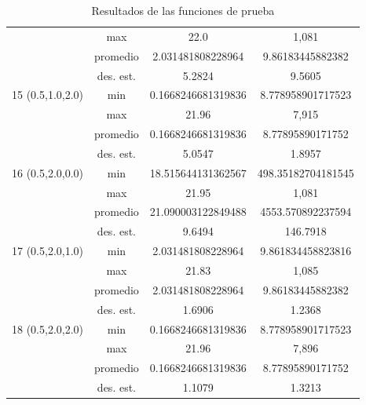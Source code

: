 \documentclass{report}
\begin{document}
\begin{table}[H]
\begin{tabular}{|c|c|c|c|}
                              & max                         &     22.0       &    1,081    \\ \cline{2-4} 
                              & promedio                    &     2.031481808228964       &    9.86183445882382    \\ \cline{2-4} 
                              & des. est.                   &  5.2824          &   9.5605     \\ \hline
        15 (0.5,1.0,2.0)                   & min                         &     0.1668246681319836       &   8.778958901717523     \\ \cline{2-4} 
                              & max                         &      21.96      &    7,915    \\ \cline{2-4} 
                              & promedio                    &      0.1668246681319836      &   8.77895890171752     \\ \cline{2-4} 
                              & des. est.                   &    5.0547        &  1.8957      \\ \hline
        16 (0.5,2.0,0.0)                   & min                         &      18.515644131362567      &    498.35182704181545    \\ \cline{2-4} 
                              & max                         &       21.95     &   1,081     \\ \cline{2-4} 
                              & promedio                    &     21.090003122849488       &   4553.570892237594     \\ \cline{2-4} 
                              & des. est.                   &    9.6494        &  146.7918      \\ \hline
        17 (0.5,2.0,1.0)                   & min                         &      2.031481808228964      &    9.861834458823816    \\ \cline{2-4} 
                              & max                         &       21.83     &    1,085    \\ \cline{2-4} 
                              & promedio                    &        2.031481808228964    &    9.86183445882382    \\ \cline{2-4} 
                              & des. est.                   &    1.6906        &  1.2368      \\ \hline
        18 (0.5,2.0,2.0)                   & min                         &     0.1668246681319836       &    8.778958901717523    \\ \cline{2-4} 
                              & max                         &      21.96      &     7,896   \\ \cline{2-4} 
                              & promedio                    &      0.1668246681319836      &    8.77895890171752    \\ \cline{2-4} 
                              & des. est.                   &   1.1079         & 1.3213       \\ \hline

        \end{tabular}
        \caption{Resultados de las funciones de prueba}
        \label{tab:resultados 2}
    \end{table}
\end{document}
